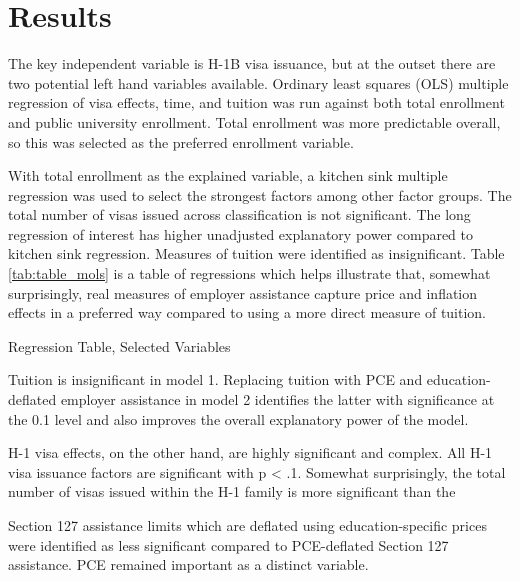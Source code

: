 \documentclass[review]{elsarticle}
\begin{document}
    \section{Results}

    The key independent variable is H-1B visa issuance, but at the outset there are two potential left hand variables available.
    Ordinary least squares (OLS) multiple regression of visa effects, time, and tuition was run against both total enrollment and public university enrollment.
    Total enrollment was more predictable overall, so this was selected as the preferred enrollment variable.

    With total enrollment as the explained variable,
    a kitchen sink multiple regression was used to select the strongest factors among other factor groups.
    The total number of visas issued across classification is not significant.
    The long regression of interest has higher unadjusted explanatory power compared to kitchen sink regression.
    Measures of tuition were identified as insignificant.
    Table \ref{tab:table_mols} is a table of regressions which helps illustrate that, somewhat surprisingly,
    real measures of employer assistance capture price and inflation effects in a preferred way
    compared to using a more direct measure of tuition.

    \begin{table}
        \caption{Regression Table, Selected Variables}
        \resizebox{\columnwidth}{!}{
            
        }
        \label{tab:table_mols}
        \end{table}

    Tuition is insignificant in model 1.
    Replacing tuition with PCE and education-deflated employer assistance in model 2 identifies the latter
    with significance at the 0.1 level and also improves the overall explanatory power of the model.


    H-1 visa effects, on the other hand, are highly significant and complex.
    All H-1 visa issuance factors are significant with p < .1.
    Somewhat surprisingly, the total number of visas issued within the H-1 family is more significant than the

    Section 127 assistance limits which are deflated using education-specific prices were identified as less significant
    compared to PCE-deflated Section 127 assistance.
    PCE remained important as a distinct variable.
    
\end{document}
